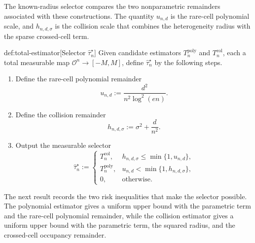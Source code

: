 \documentclass[11pt]{article}
\begin{document}
The known-radius selector compares the two nonparametric remainders associated with these constructions. The quantity \(u_{n,d}\) is the rare-cell polynomial scale, and \(h_{n,d,\sigma}\) is the collision scale that combines the heterogeneity radius with the sparse crossed-cell term.

\begin{algorithmv}{def:total-estimator}[Selector \(\widehat\tau_n^{\star}\)]
Given candidate estimators \(T_n^{\mathrm{poly}}\) and \(T_n^{\mathrm{col}}\), each a total measurable map \(\mathcal O^n\to[-M,M]\), define \(\widehat\tau_n^{\star}\) by the following steps.
\begin{enumerate}
\item Define the rare-cell polynomial remainder
\[
u_{n,d}:=\frac{d^2}{n^2\log^2(en)}.
\]
\item Define the collision remainder
\[
h_{n,d,\sigma}:=\sigma^2+\frac{d}{n^2}.
\]
\item Output the measurable selector
\[
\widehat\tau_n^{\star}:=
\begin{cases}
T_n^{\mathrm{col}},&h_{n,d,\sigma}\le\min\{1,u_{n,d}\},\\
T_n^{\mathrm{poly}},&u_{n,d}<\min\{1,h_{n,d,\sigma}\},\\
0,&\text{otherwise}.
\end{cases}
\]
\end{enumerate}
\end{algorithmv}

The next result records the two risk inequalities that make the selector possible. The polynomial estimator gives a uniform upper bound with the parametric term and the rare-cell polynomial remainder, while the collision estimator gives a uniform upper bound with the parametric term, the squared radius, and the crossed-cell occupancy remainder.
\end{document}

